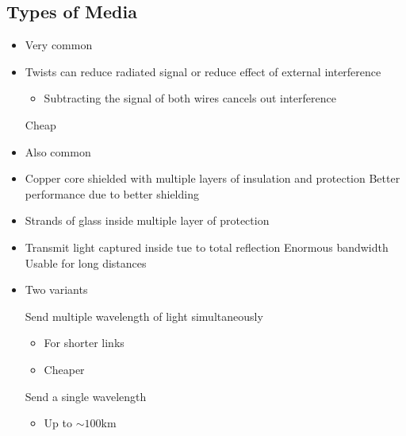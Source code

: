\subsection{Types of Media}
\begin{itemize}
        \begin{itemize}
            \item Very common
            \item Twists can reduce radiated signal or reduce effect of external interference
                \begin{itemize}
                    \item Subtracting the signal of both wires cancels out interference 
                \end{itemize}
            \ipro Cheap
        \end{itemize}
        \begin{itemize}
            \item Also common
            \item Copper core shielded with multiple layers of insulation and protection
            \ipro Better performance due to better shielding
        \end{itemize}
        \begin{itemize}
            \item Strands of glass inside multiple layer of protection
            \item Transmit light captured inside tue to total reflection
            \ipro Enormous bandwidth
            \ipro Usable for long distances
            \item Two variants
                \begin{itemize}
                     Send multiple wavelength of light simultaneously
                        \begin{itemize}
                            \item For shorter links
                            \item Cheaper
                        \end{itemize}
                     Send a single wavelength
                        \begin{itemize}
                            \item Up to $\sim 100$km
                        \end{itemize}

\end{itemize}
\end{itemize}
\end{itemize}
